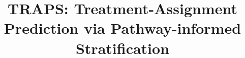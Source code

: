 \documentclass[sigconf]{acmart}
\begin{document}
\title{TRAPS: Treatment-Assignment Prediction via Pathway-informed Stratification}








\end{document}

